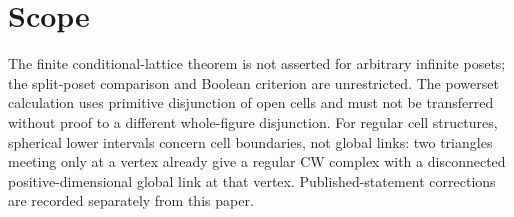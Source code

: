 \documentclass[11pt,a4paper]{article}
\theoremstyle{definition}
\begin{document}




\section{Scope}
The finite conditional-lattice theorem is not asserted for arbitrary infinite posets; the split-poset comparison and Boolean criterion are unrestricted. The powerset calculation uses primitive disjunction of open cells and must not be transferred without proof to a different whole-figure disjunction. For regular cell structures, spherical lower intervals concern cell boundaries, not global links: two triangles meeting only at a vertex already give a regular CW complex with a disconnected positive-dimensional global link at that vertex. Published-statement corrections are recorded separately from this paper.
\end{document}
